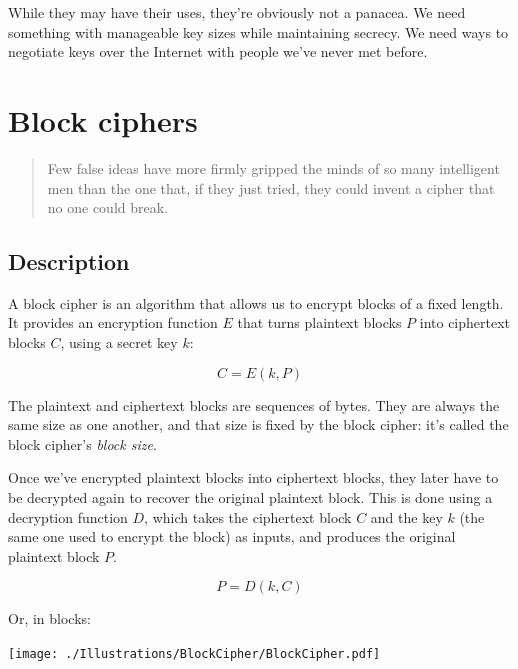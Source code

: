 \documentclass[11pt,ebook,table,dvipsnames]{memoir}
\begin{document}
While they may have their uses, they're obviously not a panacea. We
need something with manageable key sizes while maintaining secrecy. We
need ways to negotiate keys over the Internet with people we've never
met before.
\chapter{Block ciphers}
\label{sec-2-2}

\begin{quotation}
Few false ideas have more firmly gripped the minds of so many intelligent men
than the one that, if they just tried, they could invent a cipher that no one
could break.
\end{quotation}

\section{Description}
\label{sec-2-2-1}
A \gls{block cipher} is an algorithm that allows us to encrypt blocks
of a fixed length. It provides an encryption function $E$ that turns
plaintext blocks $P$ into ciphertext blocks $C$, using a secret key
$k$:

\begin{equation}
C = E(k, P)
\end{equation}

The plaintext and ciphertext blocks are sequences of bytes. They are
always the same size as one another, and that size is fixed by the
block cipher: it's called the block cipher's \emph{block size}.

Once we've encrypted plaintext blocks into ciphertext blocks, they
later have to be decrypted again to recover the original plaintext
block. This is done using a decryption function $D$, which takes the
ciphertext block $C$ and the key $k$ (the same one used to encrypt the
block) as inputs, and produces the original plaintext block $P$.

\begin{equation}
P = D(k, C)
\end{equation}

Or, in blocks:

\texttt{[image: ./Illustrations/BlockCipher/BlockCipher.pdf]}

\newcommand{\permutationimg}[1] {
\begin{figure}[ht!]
  \centering
  \texttt{[image: ./Illustrations/BlockCipher/Set\#1.pdf]}

  \texttt{[image: ./Illustrations/BlockCipher/Arrow\#1.pdf]}
\end{figure}
}
\end{document}
